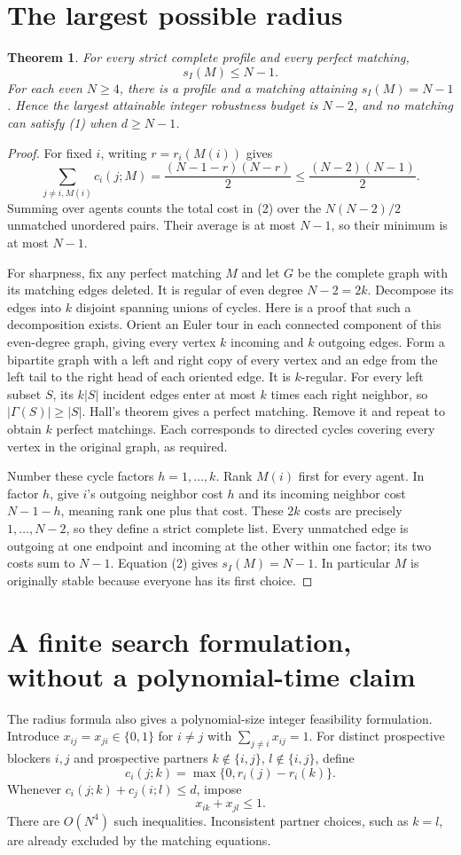 \documentclass[11pt]{article}
\newtheorem{theorem}{Theorem}
\theoremstyle{definition}
\begin{document}
\section*{The largest possible radius}
\begin{theorem}
For every strict complete profile and every perfect matching,
\[
 s_I(M)\le N-1.                                         \tag{3}
\]
For each even $N\ge4$, there is a profile and a matching attaining
$s_I(M)=N-1$. Hence the largest attainable integer robustness budget is
$N-2$, and no matching can satisfy (1) when $d\ge N-1$.
\end{theorem}
\begin{proof}
For fixed $i$, writing $r=r_i(M(i))$ gives
\[
 \sum_{j\ne i,M(i)}c_i(j;M)
 =\frac{(N-1-r)(N-r)}2
 \le\frac{(N-2)(N-1)}2.
\]
Summing over agents counts the total cost in (2) over the
$N(N-2)/2$ unmatched unordered pairs. Their average is at most $N-1$,
so their minimum is at most $N-1$.

For sharpness, fix any perfect matching $M$ and let $G$ be the complete
graph with its matching edges deleted. It is regular of even degree
$N-2=2k$. Decompose its edges into $k$ disjoint spanning unions of cycles.
Here is a proof that such a decomposition exists. Orient an Euler tour in
each connected component of this even-degree graph, giving every vertex
$k$ incoming and $k$ outgoing edges. Form a bipartite graph with a left
and right copy of every vertex and an edge from the left tail to the right
head of each oriented edge. It is $k$-regular. For every left subset $S$,
its $k|S|$ incident edges enter at most $k$ times each right neighbor, so
$|\Gamma(S)|\ge|S|$. Hall's theorem gives a perfect matching. Remove it
and repeat to obtain $k$ perfect matchings. Each corresponds to directed
cycles covering every vertex in the original graph, as required.

Number these cycle factors $h=1,\ldots,k$. Rank $M(i)$ first for every
agent. In factor $h$, give $i$'s outgoing neighbor cost $h$ and its incoming
neighbor cost $N-1-h$, meaning rank one plus that cost. These $2k$ costs
are precisely $1,\ldots,N-2$, so they define a strict complete list.
Every unmatched edge is outgoing at one endpoint and incoming at the
other within one factor; its two costs sum to $N-1$. Equation (2) gives
$s_I(M)=N-1$. In particular $M$ is originally stable because everyone has
its first choice.
\end{proof}

\section*{A finite search formulation, without a polynomial-time claim}
The radius formula also gives a polynomial-size integer feasibility
formulation. Introduce $x_{ij}=x_{ji}\in\{0,1\}$ for $i\ne j$ with
$\sum_{j\ne i}x_{ij}=1$. For distinct prospective blockers $i,j$ and
prospective partners $k\notin\{i,j\}$, $l\notin\{i,j\}$, define
\[
 c_i(j;k)=\max\{0,r_i(j)-r_i(k)\}.
\]
Whenever $c_i(j;k)+c_j(i;l)\le d$, impose
\[
 x_{ik}+x_{jl}\le1.                                    \tag{4}
\]
There are $O(N^4)$ such inequalities. Inconsistent partner choices, such
as $k=l$, are already excluded by the matching equations.
\end{document}
